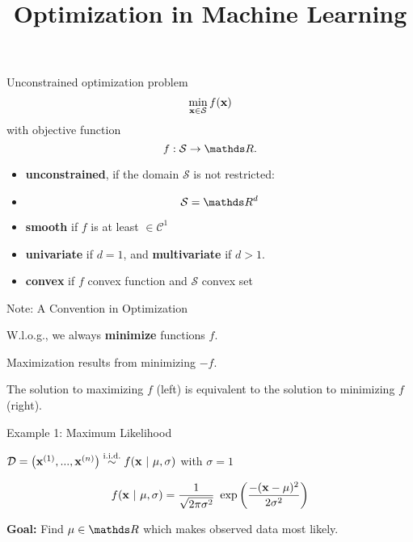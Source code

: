 \documentclass[11pt,compress,t,notes=noshow, xcolor=table]{beamer}
\title{Optimization in Machine Learning}
\begin{document}

\begin{frame2}{Unconstrained optimization problem}
$$
\min_{\xv \in \mathcal{S}} \fx
$$
with objective function
$$
f: \mathcal{S} \to \R.
$$
\begin{itemize}
\item \textbf{unconstrained}, if the domain $\mathcal{S}$ is not restricted:
\item[] $$ \mathcal{S} = \R^d $$
\item \textbf{smooth} if $f$ is at least $\in \mathcal{C}^1$
\item \textbf{univariate} if $d = 1$, and \textbf{multivariate} if $d > 1$.
\item \textbf{convex} if $f$ convex function and $\mathcal{S}$ convex set
\end{itemize}
\end{frame2}

\begin{framei}{Note: A Convention in Optimization}
\item W.l.o.g., we always \textbf{minimize} functions $f$.
\item Maximization results from minimizing $-f$.
\vfill
{}
{
}
\item The solution to maximizing $f$ (left) is equivalent to the solution to minimizing $f$ (right).
\end{framei}

\begin{framei}{Example 1: Maximum Likelihood}
\item $\D = \left(\xi[1], ..., \xi[n]\right) \overset{\text{i.i.d.}}{\sim} f(\xv ~|~ \mu, \sigma)$ with $\sigma = 1$
\item[] $$ f(\xv ~|~ \mu, \sigma) = \frac{1}{\sqrt{2 \pi \sigma^{2}}}~\exp\left(\frac{-(\xv-\mu)^{2}}{2\sigma^{2}}\right) $$
\item \textbf{Goal:} Find $\mu \in \R$ which makes observed data most likely.
\vfill
{}
\end{framei}
\end{document}
